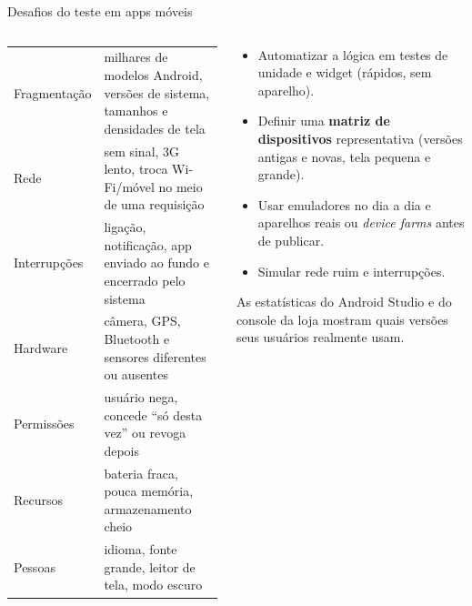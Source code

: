 \begin{frame}{Desafios do teste em apps móveis}
  \begin{columns}[T]
    \begin{column}{0.5\textwidth}
      \scriptsize
      \begin{tabularx}{\linewidth}{@{}p{2.0cm} L@{}}
        \toprule
         &  \\
        \midrule
        Fragmentação & milhares de modelos Android, versões de sistema, tamanhos e densidades de tela \\
        Rede & sem sinal, 3G lento, troca Wi-Fi/móvel no meio de uma requisição \\
        Interrupções & ligação, notificação, app enviado ao fundo e encerrado pelo sistema \\
        Hardware & câmera, GPS, Bluetooth e sensores diferentes ou ausentes \\
        Permissões & usuário nega, concede ``só desta vez'' ou revoga depois \\
        Recursos & bateria fraca, pouca memória, armazenamento cheio \\
        Pessoas & idioma, fonte grande, leitor de tela, modo escuro \\
        \bottomrule
      \end{tabularx}
    \end{column}
    \begin{column}{0.48\textwidth}
      \begin{conceito}[Estratégia]
        \begin{itemize}
          \item Automatizar a lógica em testes de unidade e widget (rápidos, sem aparelho).
          \item Definir uma \textbf{matriz de dispositivos} representativa (versões antigas e novas, tela pequena e grande).
          \item Usar emuladores no dia a dia e aparelhos reais ou \emph{device farms} antes de publicar.
          \item Simular rede ruim e interrupções.
        \end{itemize}
      \end{conceito}
      \begin{dica}
        As estatísticas do Android Studio e do console da loja mostram quais versões seus usuários realmente usam.
      \end{dica}
    \end{column}
  \end{columns}
\end{frame}


